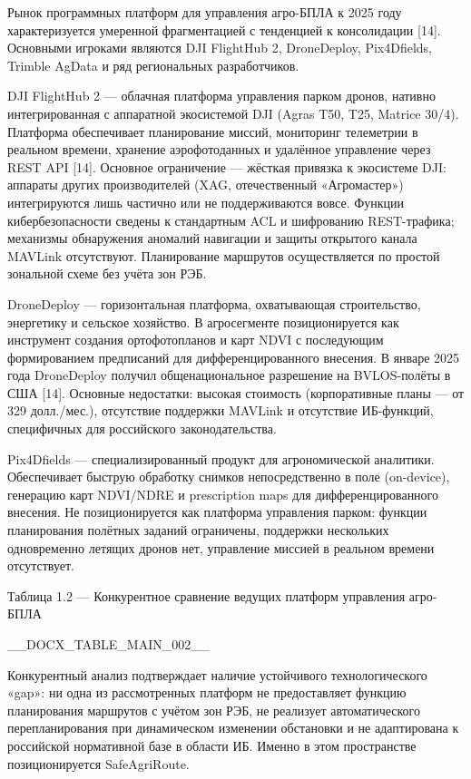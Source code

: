 \documentclass[14pt,a4paper]{extarticle}
\begin{document}
Рынок программных платформ для управления агро-БПЛА к 2025 году характеризуется умеренной фрагментацией с тенденцией к консолидации {[}14{]}. Основными игроками являются DJI FlightHub 2, DroneDeploy, Pix4Dfields, Trimble AgData и ряд региональных разработчиков.

DJI FlightHub 2 --- облачная платформа управления парком дронов, нативно интегрированная с аппаратной экосистемой DJI (Agras T50, T25, Matrice 30/4). Платформа обеспечивает планирование миссий, мониторинг телеметрии в реальном времени, хранение аэрофотоданных и удалённое управление через REST API {[}14{]}. Основное ограничение --- жёсткая привязка к экосистеме DJI: аппараты других производителей (XAG, отечественный «Агромастер») интегрируются лишь частично или не поддерживаются вовсе. Функции кибербезопасности сведены к стандартным ACL и шифрованию REST-трафика; механизмы обнаружения аномалий навигации и защиты открытого канала MAVLink отсутствуют. Планирование маршрутов осуществляется по простой зональной схеме без учёта зон РЭБ.

DroneDeploy --- горизонтальная платформа, охватывающая строительство, энергетику и сельское хозяйство. В агросегменте позиционируется как инструмент создания ортофотопланов и карт NDVI с последующим формированием предписаний для дифференцированного внесения. В январе 2025 года DroneDeploy получил общенациональное разрешение на BVLOS-полёты в США {[}14{]}. Основные недостатки: высокая стоимость (корпоративные планы --- от 329 долл./мес.), отсутствие поддержки MAVLink и отсутствие ИБ-функций, специфичных для российского законодательства.

Pix4Dfields --- специализированный продукт для агрономической аналитики. Обеспечивает быструю обработку снимков непосредственно в поле (on-device), генерацию карт NDVI/NDRE и prescription maps для дифференцированного внесения. Не позиционируется как платформа управления парком: функции планирования полётных заданий ограничены, поддержки нескольких одновременно летящих дронов нет, управление миссией в реальном времени отсутствует.

Таблица 1.2 --- Конкурентное сравнение ведущих платформ управления агро-БПЛА



__DOCX_TABLE_MAIN_002__



Конкурентный анализ подтверждает наличие устойчивого технологического «gap»: ни одна из рассмотренных платформ не предоставляет функцию планирования маршрутов с учётом зон РЭБ, не реализует автоматического перепланирования при динамическом изменении обстановки и не адаптирована к российской нормативной базе в области ИБ. Именно в этом пространстве позиционируется SafeAgriRoute.
\end{document}
